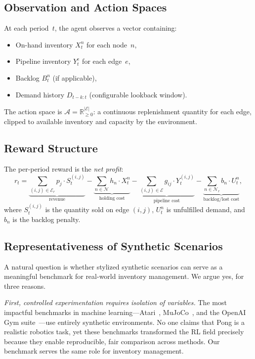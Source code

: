 \documentclass[preprint,12pt]{elsarticle}
\newcommand{\RR}{\mathbb{R}}
\begin{document}
\subsection{Observation and Action Spaces}

At each period~$t$, the agent observes a vector containing:
\begin{itemize}
  \item On-hand inventory $X_t^n$ for each node~$n$,
  \item Pipeline inventory $Y_t^e$ for each edge~$e$,
  \item Backlog $B_t^n$ (if applicable),
  \item Demand history $D_{t-k:t}$ (configurable lookback window).
\end{itemize}

The action space is $\mathcal{A} = \RR_{\geq 0}^{|\mathcal{E}|}$:
a continuous replenishment quantity for each edge, clipped to available
inventory and capacity by the environment.

\subsection{Reward Structure}

The per-period reward is the \emph{net profit}:
\begin{equation}\label{eq:reward}
  r_t = \underbrace{\sum_{(i,j) \in \mathcal{E}_r} p_j \cdot S_t^{(i,j)}}
          _{\text{revenue}}
      - \underbrace{\sum_{n \in \mathcal{N}} h_n \cdot X_t^n}
          _{\text{holding cost}}
      - \underbrace{\sum_{(i,j) \in \mathcal{E}} g_{ij} \cdot Y_t^{(i,j)}}
          _{\text{pipeline cost}}
      - \underbrace{\sum_{n \in \mathcal{N}_r} b_n \cdot U_t^n}
          _{\text{backlog/lost cost}},
\end{equation}
where $S_t^{(i,j)}$ is the quantity sold on edge $(i,j)$, $U_t^n$ is
unfulfilled demand, and $b_n$ is the backlog penalty.

\subsection{Representativeness of Synthetic Scenarios}\label{sec:representativeness}

A natural question is whether stylized synthetic scenarios can serve as a
meaningful benchmark for real-world inventory management. We argue yes,
for three reasons.

\emph{First, controlled experimentation requires isolation of variables.}
The most impactful benchmarks in machine learning---Atari~\citep{bellemare2013arcade},
MuJoCo~\citep{todorov2012mujoco}, and the OpenAI Gym
suite~\citep{brockman2016openai}---use entirely synthetic environments.
No one claims that Pong is a realistic robotics task, yet these benchmarks
transformed the RL field precisely because they enable reproducible,
fair comparison across methods. Our benchmark serves the same role for
inventory management.
\end{document}
